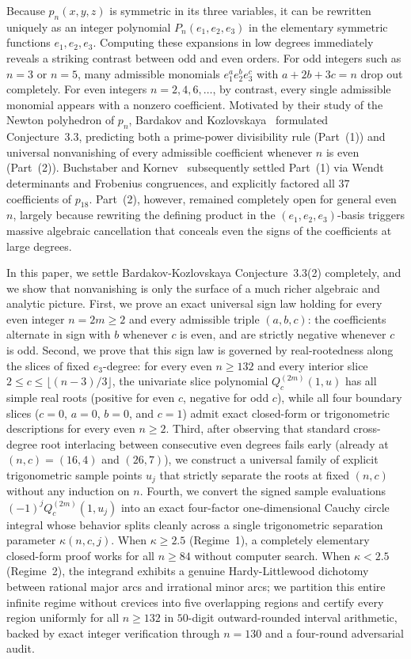 \documentclass[10pt]{article}
\numberwithin{equation}{section}
\theoremstyle{plain}
\theoremstyle{definition}
\newcommand{\1}{\mathbf{1}}
\begin{document}
Because $p_n(x, y, z)$ is symmetric in its three variables, it can be rewritten uniquely as an integer polynomial $P_n(e_1, e_2, e_3)$ in the elementary symmetric functions $e_1, e_2, e_3$. Computing these expansions in low degrees immediately reveals a striking contrast between odd and even orders. For odd integers such as $n = 3$ or $n = 5$, many admissible monomials $e_1^a e_2^b e_3^c$ with $a + 2b + 3c = n$ drop out completely. For even integers $n = 2, 4, 6, \dots$, by contrast, every single admissible monomial appears with a nonzero coefficient. Motivated by their study of the Newton polyhedron of $p_n$, Bardakov and Kozlovskaya~\cite{BK2023} formulated Conjecture~3.3, predicting both a prime-power divisibility rule (Part~(1)) and universal nonvanishing of every admissible coefficient whenever $n$ is even (Part~(2)). Buchstaber and Kornev~\cite{BKor2025} subsequently settled Part~(1) via Wendt determinants and Frobenius congruences, and explicitly factored all $37$ coefficients of $p_{18}$. Part~(2), however, remained completely open for general even $n$, largely because rewriting the defining product in the $(e_1, e_2, e_3)$-basis triggers massive algebraic cancellation that conceals even the signs of the coefficients at large degrees.

In this paper, we settle Bardakov-Kozlovskaya Conjecture~3.3(2) completely, and we show that nonvanishing is only the surface of a much richer algebraic and analytic picture. First, we prove an exact universal sign law holding for every even integer $n = 2m \ge 2$ and every admissible triple $(a, b, c)$: the coefficients alternate in sign with $b$ whenever $c$ is even, and are strictly negative whenever $c$ is odd. Second, we prove that this sign law is governed by real-rootedness along the slices of fixed $e_3$-degree: for every even $n \ge 132$ and every interior slice $2 \le c \le \lfloor (n - 3)/3 \rfloor$, the univariate slice polynomial $Q_c^{(2m)}(1, u)$ has all simple real roots (positive for even $c$, negative for odd $c$), while all four boundary slices ($c = 0$, $a = 0$, $b = 0$, and $c = 1$) admit exact closed-form or trigonometric descriptions for every even $n \ge 2$. Third, after observing that standard cross-degree root interlacing between consecutive even degrees fails early (already at $(n, c) = (16, 4)$ and $(26, 7)$), we construct a universal family of explicit trigonometric sample points $u_j$ that strictly separate the roots at fixed $(n, c)$ without any induction on $n$. Fourth, we convert the signed sample evaluations $(-1)^j Q_c^{(2m)}(1, u_j)$ into an exact four-factor one-dimensional Cauchy circle integral whose behavior splits cleanly across a single trigonometric separation parameter $\kappa(n, c, j)$. When $\kappa \ge 2.5$ (Regime~1), a completely elementary closed-form proof works for all $n \ge 84$ without computer search. When $\kappa < 2.5$ (Regime~2), the integrand exhibits a genuine Hardy-Littlewood dichotomy between rational major arcs and irrational minor arcs; we partition this entire infinite regime without crevices into five overlapping regions and certify every region uniformly for all $n \ge 132$ in $50$-digit outward-rounded interval arithmetic, backed by exact integer verification through $n = 130$ and a four-round adversarial audit.
\end{document}
